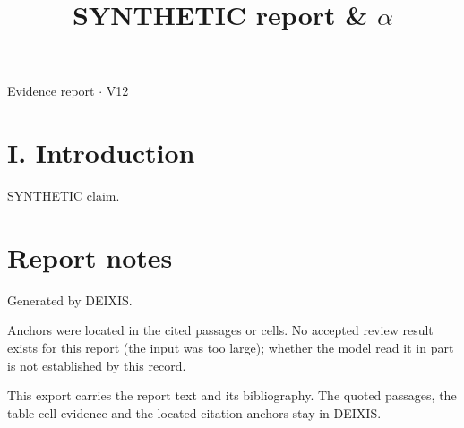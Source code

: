 \documentclass[journal]{IEEEtran}
\begin{document}
\title{SYNTHETIC report \& \ensuremath{\alpha}}

\maketitle

\noindent Evidence report \ensuremath{\cdot} V12

\section*{I. Introduction}

SYNTHETIC claim. \cite{Synth26}

\section*{Report notes}

Generated by DEIXIS.

Anchors were located in the cited passages or cells. No accepted review result exists for this report (the input was too large); whether the model read it in part is not established by this record.

This export carries the report text and its bibliography. The quoted passages, the table cell evidence and the located citation anchors stay in DEIXIS.




\end{document}
